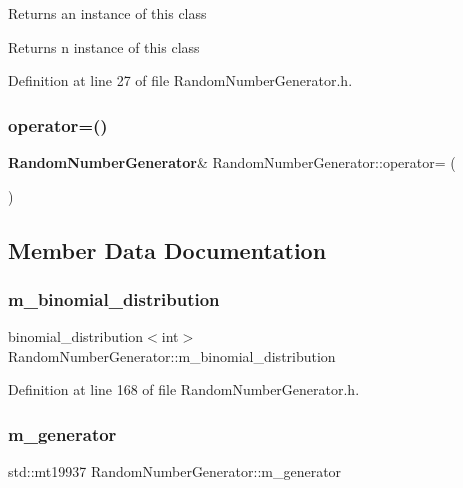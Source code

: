 Returns an instance of this class \begin{DoxyReturn}{Returns}
n instance of this class 
\end{DoxyReturn}


Definition at line 27 of file Random\+Number\+Generator.\+h.

\mbox{\label{class_random_number_generator_a5986c38214e8c774239eee89c768f172}} 
\subsubsection{operator=()}
{\footnotesize\ttfamily \textbf{ Random\+Number\+Generator}\& Random\+Number\+Generator\+::operator= (\begin{DoxyParamCaption}\item[{const \textbf{ Random\+Number\+Generator} \&}]{ }\end{DoxyParamCaption})\hspace{0.3cm}{\ttfamily [private]}}



\subsection{Member Data Documentation}
\mbox{\label{class_random_number_generator_a0669afa8b2ad0fd544f140e294ce581f}} 
\subsubsection{m\_binomial\_distribution}
{\footnotesize\ttfamily binomial\+\_\+distribution$<$int$>$ Random\+Number\+Generator\+::m\+\_\+binomial\+\_\+distribution\hspace{0.3cm}{\ttfamily [private]}}



Definition at line 168 of file Random\+Number\+Generator.\+h.

\mbox{\label{class_random_number_generator_a2fd6f5958a3c4500beee344d6af66a39}} 
\subsubsection{m\_generator}
{\footnotesize\ttfamily std\+::mt19937 Random\+Number\+Generator\+::m\+\_\+generator\hspace{0.3cm}{\ttfamily [private]}}



